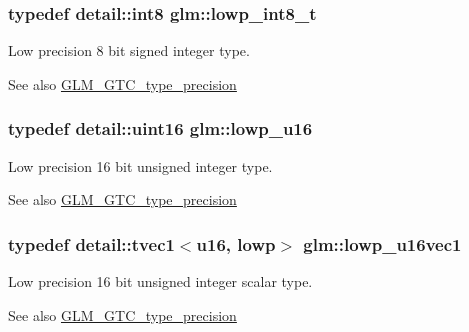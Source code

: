 \subsubsection[{\texorpdfstring{lowp\+\_\+int8\+\_\+t}{lowp_int8_t}}]{\setlength{\rightskip}{0pt plus 5cm}typedef detail\+::int8 {\bf glm\+::lowp\+\_\+int8\+\_\+t}}\hypertarget{group__gtc__type__precision_gae6092311f6970a305c2df19a372360a3}{}\label{group__gtc__type__precision_gae6092311f6970a305c2df19a372360a3}
Low precision 8 bit signed integer type. \begin{DoxySeeAlso}{See also}
\hyperlink{group__gtc__type__precision}{G\+L\+M\+\_\+\+G\+T\+C\+\_\+type\+\_\+precision} 
\end{DoxySeeAlso}
\subsubsection[{\texorpdfstring{lowp\+\_\+u16}{lowp_u16}}]{\setlength{\rightskip}{0pt plus 5cm}typedef detail\+::uint16 {\bf glm\+::lowp\+\_\+u16}}\hypertarget{group__gtc__type__precision_ga22c5364f27caa0a6eb0627cbc21e46be}{}\label{group__gtc__type__precision_ga22c5364f27caa0a6eb0627cbc21e46be}
Low precision 16 bit unsigned integer type. \begin{DoxySeeAlso}{See also}
\hyperlink{group__gtc__type__precision}{G\+L\+M\+\_\+\+G\+T\+C\+\_\+type\+\_\+precision} 
\end{DoxySeeAlso}
\subsubsection[{\texorpdfstring{lowp\+\_\+u16vec1}{lowp_u16vec1}}]{\setlength{\rightskip}{0pt plus 5cm}typedef detail\+::tvec1$<$u16, lowp$>$ {\bf glm\+::lowp\+\_\+u16vec1}}\hypertarget{group__gtc__type__precision_ga25464b09e8e3c63f6896605e0c997eb1}{}\label{group__gtc__type__precision_ga25464b09e8e3c63f6896605e0c997eb1}
Low precision 16 bit unsigned integer scalar type. \begin{DoxySeeAlso}{See also}
\hyperlink{group__gtc__type__precision}{G\+L\+M\+\_\+\+G\+T\+C\+\_\+type\+\_\+precision} 
\end{DoxySeeAlso}

